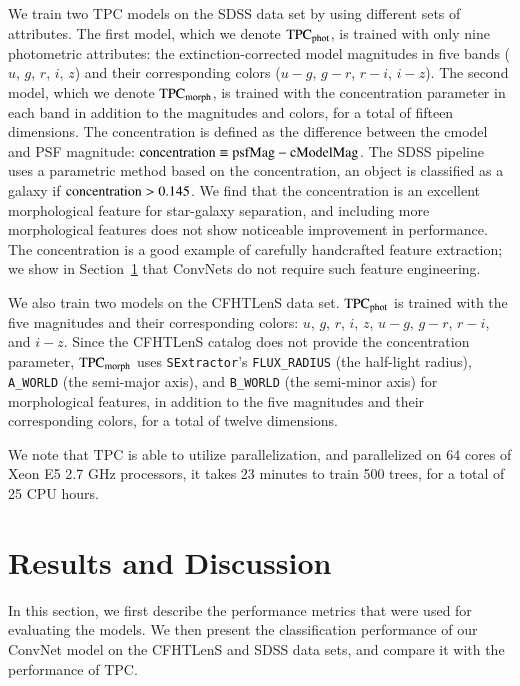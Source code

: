 \documentclass[fleqn,usenatbib]{mnras}
\begin{document}
We train two TPC models on the SDSS data set by using different sets of
attributes.
The first model, which we denote ${\mathrm{TPC}}_{{\mathrm{phot}}}$, is trained with
only nine photometric attributes:
the extinction-corrected model magnitudes in five bands
($u$, $g$, $r$, $i$, $z$)
and their corresponding colors
($u-g$, $g-r$, $r-i$, $i-z$).
The second model, which we denote ${\mathrm{TPC}}_{{\mathrm{morph}}}$, is trained with
the concentration parameter in each band in addition to the magnitudes and
colors, for a total of fifteen dimensions.
The concentration is defined as the difference between the cmodel
and PSF magnitude: ${\mathrm{concentration}}\equiv{\mathrm{psfMag}}-{\mathrm{cModelMag}}$.
The SDSS pipeline uses a parametric method based on the concentration,
an object is classified as a galaxy if ${\mathrm{concentration}}>0.145$.
We find that the concentration is an excellent morphological feature
for star-galaxy separation, and including more morphological features
does not show noticeable improvement in performance.
The concentration is a good example of carefully handcrafted feature extraction;
we show in Section~\ref{sec:results_and_discussion}
that ConvNets do not require such feature engineering.

We also train two models on the CFHTLenS data set.
${\mathrm{TPC}}_{{\mathrm{phot}}}$ is trained with 
the five magnitudes and their corresponding colors:
$u$, $g$, $r$, $i$, $z$, $u-g$, $g-r$, $r-i$, and $i-z$.
Since the CFHTLenS catalog does not provide the concentration parameter,
${\mathrm{TPC}}_{{\mathrm{morph}}}$ uses
\texttt{SExtractor}'s \texttt{FLUX\_RADIUS} (the half-light radius),
\texttt{A\_WORLD} (the semi-major axis), and \texttt{B\_WORLD}
(the semi-minor axis) for morphological features, in addition to
the five magnitudes and their corresponding colors,
for a total of twelve dimensions.

We note that TPC is able to utilize parallelization, and parallelized on 64
cores of Xeon E5 2.7 GHz processors, it takes 23 minutes to train 500 trees,
for a total of 25 CPU hours.

\section{Results and Discussion}
  \label{sec:results_and_discussion}

In this section, we first describe the performance metrics that were used for
evaluating the models.
We then present the classification performance of our ConvNet model
on the CFHTLenS and SDSS data sets, and compare it with the performance of TPC.
\end{document}
